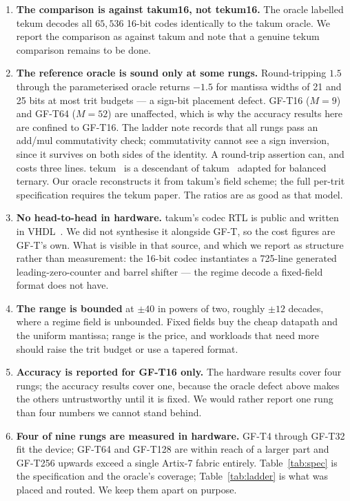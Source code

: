 \documentclass[11pt]{article}
\begin{document}
\begin{enumerate}[leftmargin=*]
\item \textbf{The comparison is against takum16, not tekum16.} The oracle
labelled tekum decodes all $65{,}536$ 16-bit codes identically to the takum
oracle. We report the comparison as against takum and note that a genuine tekum
comparison remains to be done.

\item \textbf{The reference oracle is sound only at some rungs.} Round-tripping
$1.5$ through the parameterised oracle returns $-1.5$ for mantissa widths of 21
and 25 bits at most trit budgets --- a sign-bit placement defect. GF-T16
($M{=}9$) and GF-T64 ($M{=}52$) are unaffected, which is why the accuracy results
here are confined to GF-T16. The ladder note records that all rungs pass an
add/mul commutativity check; commutativity cannot see a sign inversion, since it
survives on both sides of the identity. A round-trip assertion can, and costs
three lines. tekum~\cite{tekum} is a descendant of takum~\cite{takum} adapted for balanced
ternary. Our
oracle reconstructs it from takum's field scheme; the full per-trit
specification requires the tekum paper. The ratios are as good as that model.

\item \textbf{No head-to-head in hardware.} takum's codec RTL is public and
written in VHDL~\cite{takumrtl}. We did not synthesise it alongside GF-T, so the cost figures are
GF-T's own. What is visible in that source, and which we report as structure
rather than measurement: the 16-bit codec instantiates a 725-line generated
leading-zero-counter and barrel shifter --- the regime decode a fixed-field
format does not have.

\item \textbf{The range is bounded} at $\pm40$ in powers of two, roughly $\pm12$
decades, where a regime field is unbounded. Fixed fields buy the cheap datapath
and the uniform mantissa; range is the price, and workloads that need more should
raise the trit budget or use a tapered format.

\item \textbf{Accuracy is reported for GF-T16 only.} The hardware results cover
four rungs; the accuracy results cover one, because the oracle defect above makes
the others untrustworthy until it is fixed. We would rather report one rung than
four numbers we cannot stand behind.

\item \textbf{Four of nine rungs are measured in hardware.} GF-T4 through GF-T32 fit the
device; GF-T64 and GF-T128 are within reach of a larger part and GF-T256 upwards
exceed a single Artix-7 fabric entirely. Table~\ref{tab:spec} is the
specification and the oracle's coverage; Table~\ref{tab:ladder} is what was
placed and routed. We keep them apart on purpose.


\end{enumerate}
\end{document}
